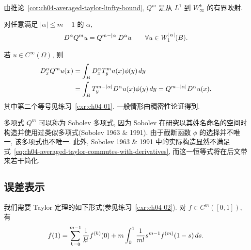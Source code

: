 由推论~\ref{cor:ch04-averaged-taylor-linfty-bound}, $Q^m$ 是从 $L^1$ 到 $W_\infty^k$ 的有界映射.

\begin{Proposition}
\label{prop:ch04-averaged-taylor-commutes-with-derivatives}
对任意满足 $|\alpha|\leq m-1$ 的 $\alpha$,
\begin{equation}
\MathBookFormulaID{formula-ch04-averaged-taylor-commutes-with-derivatives}
\label{eq:ch04-averaged-taylor-commutes-with-derivatives}
D^\alpha Q^m u=Q^{m-|\alpha|}D^\alpha u
\qquad\forall u\in W_1^{|\alpha|}(B).
\end{equation}
\end{Proposition}
\begin{Proof}
若 $u\in C^\infty(\Omega)$, 则
\[
\MathBookFormulaID{formula-ch04-averaged-taylor-derivative-proof}
\begin{aligned}
D_x^\alpha Q^m u(x)
&=\int_BD_x^\alpha T_y^m u(x)\phi(y)\,dy\\
&=\int_BT_y^{m-|\alpha|}D^\alpha u(x)\phi(y)\,dy
=Q^{m-|\alpha|}D^\alpha u(x),
\end{aligned}
\]
其中第二个等号见练习~\ref{exr:ch04-01}. 一般情形由稠密性论证得到.
\end{Proof}

\setcounter{thmcount}{18}
\begin{Remark}
\label{rem:ch04-sobolev-polynomial}
多项式 $Q^m$ 可以称为 Sobolev 多项式, 因为 Sobolev 在研究以其姓名命名的空间时构造并使用过类似多项式(Sobolev 1963 \& 1991). 由于截断函数 $\phi$ 的选择并不唯一, 该多项式也不唯一. 此外, Sobolev 1963 \& 1991 中的实际构造显然不满足式~\eqref{eq:ch04-averaged-taylor-commutes-with-derivatives}, 而这一恒等式将在后文带来若干简化.
\end{Remark}

\subsection{误差表示}
\label{sec:ch04-error-representation}
\setcounter{thmcount}{0}
\setcounter{equation}{0}

我们需要 Taylor 定理的如下形式(参见练习~\ref{exr:ch04-02}). 对 $f\in C^m([0,1])$, 有
\begin{equation}
\MathBookFormulaID{formula-ch04-taylor-theorem-integral-form}
\label{eq:ch04-taylor-theorem-integral-form}
f(1)=\sum_{k=0}^{m-1}\frac1{k!}f^{(k)}(0)
+m\int_0^1\frac1{m!}s^{m-1}f^{(m)}(1-s)\,ds.
\end{equation}

